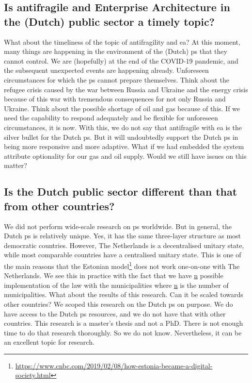 \subsection{Is antifragile and Enterprise Architecture in the (Dutch) public sector a timely topic?}
\label{sub:timelytopic}
What about the timeliness of the topic of \gls{antifragility} and \gls{ea}? At this moment, many things are happening in the environment of the (Dutch) \gls{ps} that they cannot control. We are (hopefully) at the end of the COVID-19 pandemic, and the subsequent unexpected events are happening already. Unforeseen circumstances for which the \gls{ps} cannot prepare themselves. Think about the refugee crisis caused by the war between Russia and Ukraine and the energy crisis because of this war with tremendous consequences for not only Russia and Ukraine. Think about the possible shortage of oil and gas because of this. If we need the capability to respond adequately and be flexible for unforeseen circumstances, it is now. With this, we do not say that \gls{antifragile} with \gls{ea} is the silver bullet for the Dutch \gls{ps}. But it will undoubtedly support the Dutch \gls{ps} in being more responsive and more adaptive. What if we had embedded the system \gls{attribute} \gls{optionality} for our gas and oil supply. Would we still have issues on this matter?

\subsection{Is the Dutch public sector different than that from other countries?}
\label{sub:differencepublicsector}
We did not perform wide-scale research on \gls{ps} worldwide. But in general, the Dutch \gls{ps} is relatively unique. Yes, it has the same three-layer structure as most democratic countries. However, The Netherlands is a decentralised unitary state, while most comparable countries have a centralised unitary state. This is one of the main reasons that the Estonian model\footnote{\url{https://www.cnbc.com/2019/02/08/how-estonia-became-a-digital-society.html}} does not work one-on-one with The Netherlands. We see this in practice with the fact that we have \underline{n} possible implementation of the law with the municipalities where \underline{n} is the number of municipalities. What about the results of this research. Can it be scaled towards other countries? We scoped this research on the Dutch \gls{ps} on purpose. We do have access to the Dutch \gls{ps} resources, and we do not have that with other countries. This research is a master's thesis and not a PhD. There is not enough time to do that research thoroughly. So we do not know. Nevertheless, it can be an excellent topic for research.

